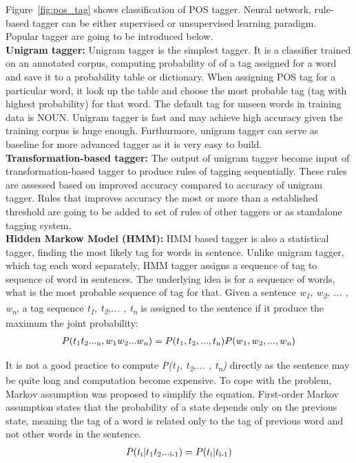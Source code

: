 Figure~\ref{fig:pos_tag} shows classification of POS tagger. Neural network, rule-based tagger can be either supervised or unsupervised learning paradigm. Popular tagger are going to be introduced below.\\
\textbf{Unigram tagger:} Unigram tagger is the simplest tagger. It is a classifier trained on an annotated corpus, computing probability of of a tag assigned for a word and save it to a probability table or dictionary. When assigning POS tag for a particular word, it look up the table and choose the most probable tag (tag with highest probability) for that word. The default tag for unseen words in training data is NOUN. Unigram tagger is fast and may achieve high accuracy given the training corpus is huge enough. Furthurmore, unigram tagger can serve as baseline for more advanced tagger as it is very easy to build. \\

\textbf{Transformation-based tagger:} The output of unigram tagger become input of transformation-based tagger to produce rules of tagging sequentially. These rules are assessed based on improved accuracy compared to accuracy of unigram tagger. Rules that improves accuracy the most or more than a established threshold are going to be added to set of rules of other taggers or as standalone tagging system.\\

\textbf{Hidden Markow Model (HMM):} HMM based tagger is also a statistical tagger, finding the most likely tag for words in sentence. Unlike unigram tagger, which tag each word separately, HMM tagger assigns a sequence of tag to sequence of word in sentences. The underlying idea is for a sequence of words, what is the most probable sequence of tag for that. Given a sentence \textit{w\textsubscript{1}, w\textsubscript{2}, ... , w\textsubscript{n}}, a tag sequence \textit{t\textsubscript{1}, t\textsubscript{2},... , t\textsubscript{n}} is assigned to the sentence if it produce the maximum the joint probability:
\begin{eqnarray*}
P(t\textsubscript{1}t\textsubscript{2}...\textsubscript{n} , w\textsubscript{1}w\textsubscript{2}...w\textsubscript{n}) = P(t\textsubscript{1}, t\textsubscript{2},... , t\textsubscript{n}) P(w\textsubscript{1}, w\textsubscript{2}, ... , w\textsubscript{n})
\end{eqnarray*}

It is not a good practice to compute \textit{P(t\textsubscript{1}, t\textsubscript{2},... , t\textsubscript{n})} directly as the sentence may be quite long and computation become expensive. To cope with the problem, Markov assumption was proposed to simplify the equation. First-order Markov assumption states that the probability of a state depends only on the previous state, meaning the tag of a word is related only to the tag of previous word and not other words in the sentence.
\begin{eqnarray*}
P(t\textsubscript{i} \vert t\textsubscript{1}t\textsubscript{2}...\textsubscript{i-1}) = P(t\textsubscript{i} \vert t\textsubscript{i-1})
\end{eqnarray*}

